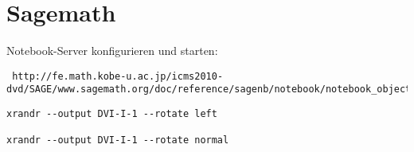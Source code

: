 \section{Sagemath}

Notebook-Server konfigurieren und starten:

{\scriptsize
\begin{verbatim}
 http://fe.math.kobe-u.ac.jp/icms2010-dvd/SAGE/www.sagemath.org/doc/reference/sagenb/notebook/notebook_object.html

\end{verbatim}
}

\begin{verbatim}
xrandr --output DVI-I-1 --rotate left

xrandr --output DVI-I-1 --rotate normal
\end{verbatim}

